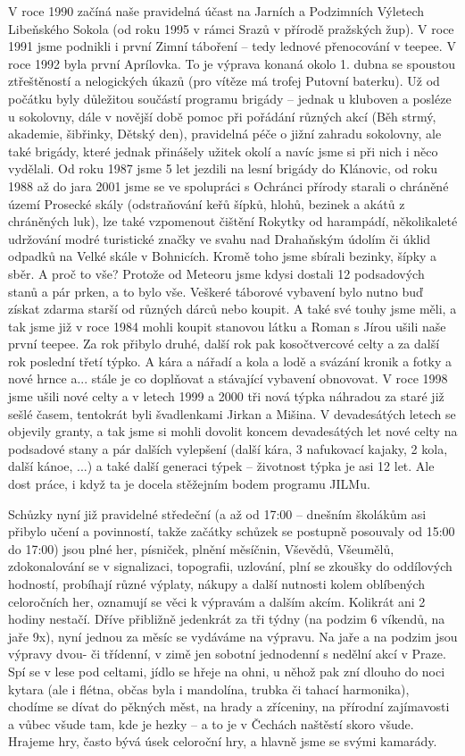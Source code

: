 V roce 1990 začíná naše pravidelná účast na Jarních a Podzimních
Výletech Libeňského Sokola (od roku 1995 v rámci Srazů v přírodě
pražských žup). V roce 1991 jsme podnikli i první Zimní táboření -- tedy
lednové přenocování v teepee. V roce 1992 byla první Aprílovka. To je
výprava konaná okolo 1. dubna se spoustou ztřeštěností a nelogických
úkazů (pro vítěze má trofej Putovní baterku). Už od počátku byly
důležitou součástí programu brigády -- jednak u kluboven a posléze u
sokolovny, dále v novější době pomoc při pořádání různých akcí (Běh
strmý, akademie, šibřinky, Dětský den), pravidelná péče o jižní zahradu
sokolovny, ale také brigády, které jednak přinášely užitek okolí a navíc
jsme si při nich i něco vydělali. Od roku 1987 jsme 5 let jezdili na
lesní brigády do Klánovic, od roku 1988 až do jara 2001 jsme se ve
spolupráci s Ochránci přírody starali o chráněné území Prosecké skály
(odstraňování keřů šípků, hlohů, bezinek a akátů z chráněných luk), lze
také vzpomenout čištění Rokytky od harampádí, několikaleté udržování
modré turistické značky ve svahu nad Drahaňským údolím či úklid odpadků
na Velké skále v Bohnicích. Kromě toho jsme sbírali bezinky, šípky a
sběr. A proč to vše? Protože od Meteoru jsme kdysi dostali 12
podsadových stanů a pár prken, a to bylo vše. Veškeré táborové vybavení
bylo nutno buď získat zdarma starší od různých dárců nebo koupit. A také
své touhy jsme měli, a tak jsme již v roce 1984 mohli koupit stanovou
látku a Roman s Jírou ušili naše první teepee. Za rok přibylo druhé,
další rok pak kosočtvercové celty a za další rok poslední třetí týpko. A
kára a nářadí a kola a lodě a svázání kronik a fotky a nové hrnce a...
stále je co doplňovat a stávající vybavení obnovovat. V roce 1998 jsme
ušili nové celty a v letech 1999 a 2000 tři nová týpka náhradou za staré
již sešlé časem, tentokrát byli švadlenkami Jirkan a Mišina. V
devadesátých letech se objevily granty, a tak jsme si mohli dovolit
koncem devadesátých let nové celty na podsadové stany a pár dalších
vylepšení (další kára, 3 nafukovací kajaky, 2 kola, další kánoe, ...) a
také další generaci týpek -- životnost týpka je asi 12 let. Ale dost
práce, i když ta je docela stěžejním bodem programu JILMu.

Schůzky nyní již pravidelné středeční (a až od 17:00 -- dnešním školákům
asi přibylo učení a povinností, takže začátky schůzek se postupně
posouvaly od 15:00 do 17:00) jsou plné her, písniček, plnění měsíčnin,
Vševědů, Všeumělů, zdokonalování se v signalizaci, topografii, uzlování,
plní se zkoušky do oddílových hodností, probíhají různé výplaty, nákupy
a další nutnosti kolem oblíbených celoročních her, oznamují se věci k
výpravám a dalším akcím. Kolikrát ani 2 hodiny nestačí. Dříve přibližně
jedenkrát za tři týdny (na podzim 6 víkendů, na jaře 9x), nyní jednou za
měsíc se vydáváme na výpravu. Na jaře a na podzim jsou výpravy dvou- či
třídenní, v zimě jen sobotní jednodenní s nedělní akcí v Praze. Spí se v
lese pod celtami, jídlo se hřeje na ohni, u něhož pak zní dlouho do noci
kytara (ale i flétna, občas byla i mandolína, trubka či tahací
harmonika), chodíme se dívat do pěkných měst, na hrady a zříceniny, na
přírodní zajímavosti a vůbec všude tam, kde je hezky -- a to je v
Čechách naštěstí skoro všude. Hrajeme hry, často bývá úsek celoroční
hry, a hlavně jsme se svými kamarády.

